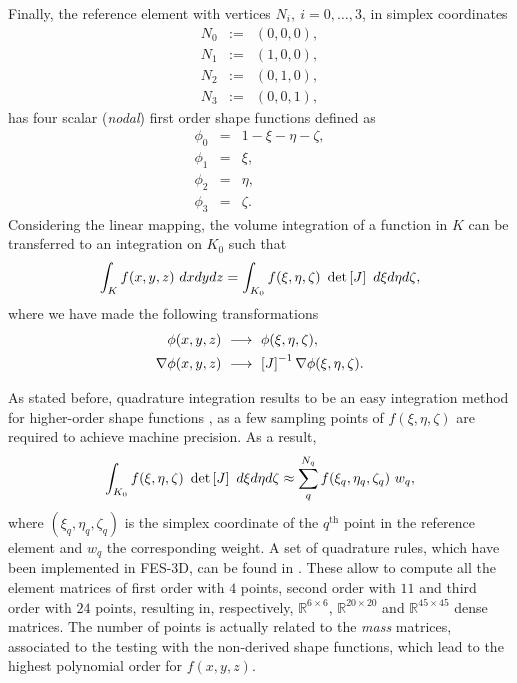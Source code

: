 Finally, the reference element with vertices $N_i, \ i=0,\ldots,3$, in simplex coordinates
\begin{eqnarray*}
N_0 &:= & (0,0,0),\\
N_1 &:= & (1,0,0),\\
N_2 &:= & (0,1,0),\\
N_3 &:= & (0,0,1),
\end{eqnarray*}
\noindent has four scalar (\textit{nodal}) first order shape functions defined as
\begin{eqnarray*}
\phi_0 &= &1 - \xi - \eta -\zeta, \\
\phi_1 &= &\xi, \\
\phi_2 &= &\eta, \\
\phi_3 &= &\zeta.
\end{eqnarray*}
\noindent Considering the linear mapping, the volume integration of a function in $K$ can be transferred to an integration on $K_0$ such that \cite{pelosi2009quick}
%
\begin{equation}
\int_{K} f(x,y,z) \ dx dy dz = \int_{K_0} f(\xi, \eta, \zeta) \ \det\left[J\right] \ d\xi d\eta d\zeta,
\end{equation}
%
\noindent where we have made the following transformations
\begin{equation}
\begin{aligned}
\phi(x,y,z) \ & \longrightarrow \ \phi(\xi, \eta, \zeta),\\
\nabla\phi(x,y,z) \ & \longrightarrow \ \left[J\right]^{-1} \nabla \phi(\xi, \eta, \zeta).
\end{aligned}
\end{equation}

As stated before, quadrature integration results to be an easy integration method for higher-order shape functions \cite{rachowicz2005hp, zaglmayr2006high}, as a few sampling points of $f(\xi, \eta, \zeta)$ are required to achieve machine precision. %
As a result,
%
$$\int_{K_0} f(\xi, \eta, \zeta) \ \det\mat{J} \ d\xi d\eta d\zeta \approx \sum_q^{N_q} f(\xi_q, \eta_q, \zeta_q) \ w_q, $$
%
\noindent where $(\xi_q, \eta_q, \zeta_q)$ is the simplex coordinate of the $q^\mathrm{th}$ point in the reference element and $w_q$ the corresponding weight. A set of quadrature rules, which have been implemented in FES-3D, can be found in \cite{keast1986moderate}. These allow to compute all the element matrices of first order with $4$ points, second order with $11$ and third order with $24$ points, resulting in, respectively, $\mathbb{R}^{6\times6}$, $\mathbb{R}^{20\times20}$ and $\mathbb{R}^{45\times45}$ dense matrices. The number of points is actually related to the \textit{mass} matrices, associated to the testing with the non-derived shape functions, which lead to the highest polynomial order for $f(x,y,z)$.

